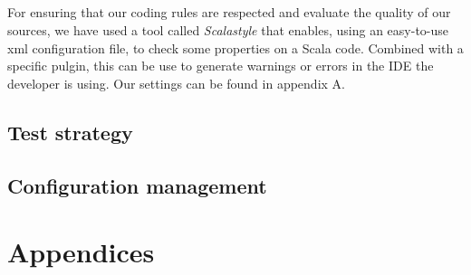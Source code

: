 \documentclass{report}
\begin{document}
\paragraph{}
\hspace{4mm}\textnormal{For ensuring that our coding rules are respected and evaluate the quality of our sources, we have
used a tool called \textit{Scalastyle} that enables, using an easy-to-use xml configuration file, to check
some properties on a Scala code. Combined with a specific pulgin, this can be use to generate warnings or errors
in the IDE the developer is using. Our settings can be found in appendix A.}

\section{Test strategy}

\paragraph{}
\hspace{4mm}\textnormal{}

\section{Configuration management}

\paragraph{}
\hspace{4mm}\textnormal{}

\chapter{Appendices}
\end{document}
